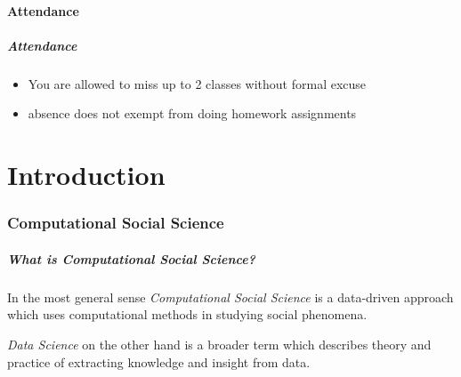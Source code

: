 \subsection[Attendance]{Attendance}
\begin{frame}
    \frametitle{Attendance}
    \begin{itemize}
        \item You are allowed to miss up to 2 classes without formal excuse
        \item  absence does not exempt from doing homework assignments
    \end{itemize}
\end{frame}


\part[Introduction]{Introduction}
\frame{\partpage}

\section[CSS]{Computational Social Science}

\begin{frame}
    \frametitle{What is Computational Social Science?}
    \begin{block}{}
        In the most general sense \emph{Computational Social Science} is a data-driven approach which uses computational methods in studying social phenomena.
    \end{block}
    \begin{block}{}
        \emph{Data Science} on the other hand is a broader term which describes theory and practice of extracting knowledge and insight from data.
    \end{block}
\end{frame}

